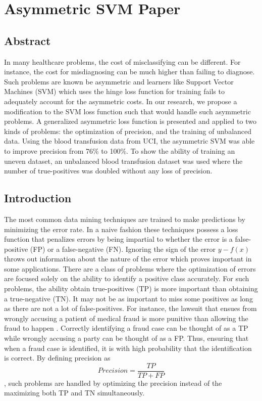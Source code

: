 \chapter{Asymmetric SVM Paper}\label{chapter:SVMpaper}
\section{Abstract}\label{Abstract}
In many healthcare problems, the cost of misclassifying can be different. For instance, the cost for misdiagnosing can be much higher than failing to diagnose. Such problems are known be asymmetric and learners like Support Vector Machines (SVM) which uses the hinge loss function for training fails to adequately account for the asymmetric costs. In our research, we propose a modification to the SVM loss function such that would handle such asymmetric problems. A generalized asymmetric loss function is presented and applied to two kinds of problems: the optimization of precision, and the training of unbalanced data. Using the blood transfusion data from UCI, the asymmetric SVM was able to improve precision from 76\% to 100\%. To show the ability of training an uneven dataset, an unbalanced blood transfusion dataset was used where the number of true-positives was doubled without any loss of precision.

\section{Introduction}\label{Introduction}

The most common data mining techniques are trained to make predictions by minimizing the error rate. In a naive fashion these techniques possess a loss function that penalizes errors by being impartial to whether the error is a false-positive (FP) or a false-negative (FN). Ignoring the sign of the error $y-f(x)$ throws out information about the nature of the error which proves important in some applications. There are a class of problems where the optimization of errors are focused solely on the ability to identify a positive class accurately. For such problems, the ability obtain true-positives (TP) is more important than obtaining a true-negative (TN). It may not be as important to miss some positives as long as there are not a lot of false-positives. For instance, the lawsuit that ensues from wrongly accusing a patient of medical fraud is more punitive than allowing the fraud to happen \citep{Liou08}. Correctly identifying a fraud case can be thought of as a TP while wrongly accusing a party can be thought of as a FP. Thus, ensuring that when a fraud case is identified, it is with high probability that the identification is correct. By defining precision as
 \begin{equation} \label{Eq:precision}
Precision=\frac{TP}{TP+FP}
\end{equation}
, such problems are handled by optimizing the precision instead of the maximizing both TP and TN simultaneously. 

